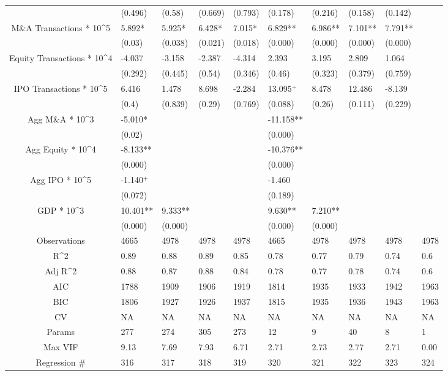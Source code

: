 \documentclass{article}
\begin{document}
\begin{table}[H]
\begin{tabular}{|clllllllll|}
   & (0.496) & (0.58) & (0.669) & (0.793) & (0.178) & (0.216) & (0.158) & (0.142) &  \\
  M\&A Transactions * 10^5 & 5.892* & 5.925* & 6.428* & 7.015* & 6.829** & 6.986** & 7.101** & 7.791** &  \\
   & (0.03) & (0.038) & (0.021) & (0.018) & (0.000) & (0.000) & (0.000) & (0.000) &  \\
  Equity Transactions * 10^4 & -4.037 & -3.158 & -2.387 & -4.314 & 2.393 & 3.195 & 2.809 & 1.064 &  \\
   & (0.292) & (0.445) & (0.54) & (0.346) & (0.46) & (0.323) & (0.379) & (0.759) &  \\
  IPO Transactions * 10^5 & 6.416 & 1.478 & 8.698 & -2.284 & 13.095$^{+}$ & 8.478 & 12.486 & -8.139 &  \\
   & (0.4) & (0.839) & (0.29) & (0.769) & (0.088) & (0.26) & (0.111) & (0.229) &  \\
  Agg M\&A * 10^3 & -5.010* &  &  &  & -11.158** &  &  &  &  \\
   & (0.02) &  &  &  & (0.000) &  &  &  &  \\
  Agg Equity * 10^4 & -8.133** &  &  &  & -10.376** &  &  &  &  \\
   & (0.000) &  &  &  & (0.000) &  &  &  &  \\
  Agg IPO * 10^5 & -1.140$^{+}$ &  &  &  & -1.460 &  &  &  &  \\
   & (0.072) &  &  &  & (0.189) &  &  &  &  \\
  GDP * 10^3 & 10.401** & 9.333** &  &  & 9.630** & 7.210** &  &  &  \\
   & (0.000) & (0.000) &  &  & (0.000) & (0.000) &  &  &  \\
  \hline
 Observations & 4665 & 4978 & 4978 & 4978 & 4665 & 4978 & 4978 & 4978 & 4978 \\
  R^2 & 0.89 & 0.88 & 0.89 & 0.85 & 0.78 & 0.77 & 0.79 & 0.74 & 0.6 \\
  Adj R^2 & 0.88 & 0.87 & 0.88 & 0.84 & 0.78 & 0.77 & 0.78 & 0.74 & 0.6 \\
  AIC & 1788 & 1909 & 1906 & 1919 & 1814 & 1935 & 1933 & 1942 & 1963 \\
  BIC & 1806 & 1927 & 1926 & 1937 & 1815 & 1935 & 1936 & 1943 & 1963 \\
  CV & NA & NA & NA & NA & NA & NA & NA & NA & NA \\
  Params & 277 & 274 & 305 & 273 & 12 & 9 & 40 & 8 & 1 \\
  Max VIF & 9.13 & 7.69 & 7.93 & 6.71 & 2.71 & 2.73 & 2.77 & 2.71 & 0.00 \\
  Regression \# & 316 & 317 & 318 & 319 & 320 & 321 & 322 & 323 & 324 \\
   \hline
\end{tabular}

\end{table}
\end{document}
